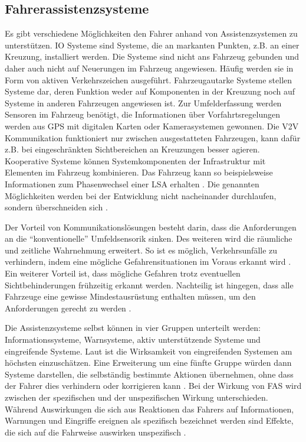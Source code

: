 \subsection{Fahrerassistenzsysteme}
Es gibt verschiedene Möglichkeiten den Fahrer anhand von Assistenzsystemen zu unterstützen. \ac{IO} Systeme sind Systeme, die an markanten Punkten, z.B. an einer Kreuzung, installiert werden. Die Systeme sind nicht ans Fahrzeug gebunden und daher auch nicht auf Neuerungen im  Fahrzeug angewiesen. Häufig werden sie in Form von aktiven Verkehrszeichen ausgeführt. Fahrzeugautarke Systeme stellen Systeme dar, deren Funktion weder auf Komponenten in der Kreuzung noch auf Systeme in anderen Fahrzeugen angewiesen ist. Zur Umfelderfassung werden Sensoren im Fahrzeug benötigt, die Informationen über Vorfahrtsregelungen werden aus GPS mit digitalen Karten oder Kamerasystemen gewonnen. Die \ac{V2V} Kommunikation funktioniert nur zwischen ausgestatteten Fahrzeugen, kann dafür z.B. bei eingeschränkten Sichtbereichen an Kreuzungen besser agieren. Kooperative Systeme können Systemkomponenten der Infrastruktur mit Elementen im Fahrzeug kombinieren. Das Fahrzeug kann so beispielsweise Informationen zum Phasenwechsel einer LSA erhalten \parencite[S. 23-26]{Mages.2008}. Die genannten Möglichkeiten werden bei der Entwicklung nicht nacheinander durchlaufen, sondern überschneiden sich \parencite[S. 88]{WissenschaflicherBeiratbeimBundesministerfurVerkehrBauundStadtentwicklung.2011}.

Der Vorteil von Kommunikationslösungen besteht darin, dass die Anforderungen an die \enquote{konventionelle} Umfeldsensorik sinken. Des weiteren wird die räumliche und zeitliche Wahrnehmung erweitert. So ist es möglich, Verkehrsunfälle zu verhindern, indem eine mögliche Gefahrensituationen im Voraus erkannt wird \parencite[S. 59]{Gerstenberger.17.02.2015}. Ein weiterer Vorteil ist, dass mögliche Gefahren trotz eventuellen Sichtbehinderungen frühzeitig erkannt werden. Nachteilig ist hingegen, dass alle Fahrzeuge eine gewisse Mindestausrüstung enthalten müssen, um den Anforderungen gerecht zu werden \parencite[S. 2]{Mages.2008}.

Die Assistenzsysteme selbst können in vier Gruppen unterteilt werden: Informationssysteme, Warnsysteme, aktiv unterstützende Systeme und eingreifende Systeme. Laut \Textcite[S. 11]{Meitinger.2008} ist die Wirksamkeit von eingreifenden Systemen am höchsten einzuschätzen. Eine Erweiterung um eine fünfte Gruppe würden dann Systeme darstellen, die selbständig bestimmte Aktionen übernehmen, ohne dass der Fahrer dies verhindern oder korrigieren kann \parencite[S. 13]{Vollrath.2006}. Bei der Wirkung von FAS wird zwischen der spezifischen und der unspezifischen Wirkung unterschieden. Während Auswirkungen die sich aus Reaktionen das Fahrers auf Informationen, Warnungen und Eingriffe ereignen als spezifisch bezeichnet werden sind Effekte, die sich auf die Fahrweise auswirken unspezifisch \parencite[S. 50f]{Grundl.2005}.

